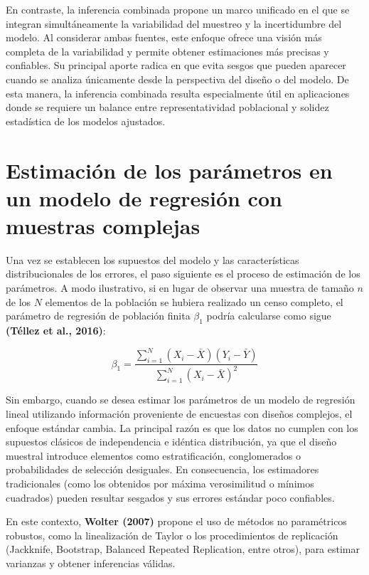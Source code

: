 \documentclass[
  spanish,
  12pt,
]{book}
\begin{document}
En contraste, la inferencia combinada propone un marco unificado en el que se integran simultáneamente la variabilidad del muestreo y la incertidumbre del modelo. Al considerar ambas fuentes, este enfoque ofrece una visión más completa de la variabilidad y permite obtener estimaciones más precisas y confiables. Su principal aporte radica en que evita sesgos que pueden aparecer cuando se analiza únicamente desde la perspectiva del diseño o del modelo. De esta manera, la inferencia combinada resulta especialmente útil en aplicaciones donde se requiere un balance entre representatividad poblacional y solidez estadística de los modelos ajustados.

\section{Estimación de los parámetros en un modelo de regresión con muestras complejas}\label{estimaciuxf3n-de-los-paruxe1metros-en-un-modelo-de-regresiuxf3n-con-muestras-complejas}

Una vez se establecen los supuestos del modelo y las características distribucionales de los errores, el paso siguiente es el proceso de estimación de los parámetros. A modo ilustrativo, si en lugar de observar una muestra de tamaño \(n\) de los \(N\) elementos de la población se hubiera realizado un censo completo, el parámetro de regresión de población finita \(\beta_{1}\) podría calcularse como sigue \textbf{(Téllez et al., 2016)}:

\[
\beta_{1}  =  \frac{\sum_{i=1}^{N}\left(X_{i}-\bar{X}\right)\left(Y_{i}-\bar{Y}\right)}{\sum_{i=1}^{N}\left(X_{i}-\bar{X}\right)^{2}}
\]

Sin embargo, cuando se desea estimar los parámetros de un modelo de regresión lineal utilizando información proveniente de encuestas con diseños complejos, el enfoque estándar cambia. La principal razón es que los datos no cumplen con los supuestos clásicos de independencia e idéntica distribución, ya que el diseño muestral introduce elementos como estratificación, conglomerados o probabilidades de selección desiguales. En consecuencia, los estimadores tradicionales (como los obtenidos por máxima verosimilitud o mínimos cuadrados) pueden resultar sesgados y sus errores estándar poco confiables.

En este contexto, \textbf{Wolter (2007)} propone el uso de métodos no paramétricos robustos, como la linealización de Taylor o los procedimientos de replicación (Jackknife, Bootstrap, Balanced Repeated Replication, entre otros), para estimar varianzas y obtener inferencias válidas.
\end{document}

